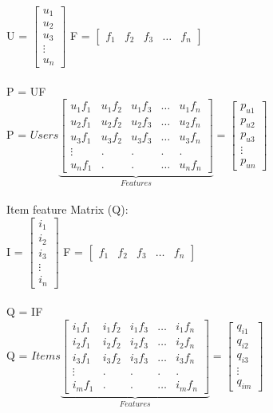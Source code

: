 \documentclass{article}
\begin{document}
\begin{center}
U = $\begin{bmatrix}
    u_1 \\ u_2 \\ u_3 \\ \vdots \\ u_n
\end{bmatrix}$
F = $\begin{bmatrix}
    f_1 & f _2 & f_3 & \hdots & f_n
\end{bmatrix}$ \\~\\
P = UF \\
P =
$Users\underbrace{\begin{bmatrix}
    u_1f_1 & u_1f_2 & u_1f_3 & \hdots &  u_1f_n\\ 
    u_2f_1 & u_2f_2 & u_2f_3 & \hdots &  u_2f_n\\
    u_3f_1 & u_3f_2 & u_3f_3 & \hdots &  u_3f_n\\ 
    \vdots & . & . & . & .\\
    u_nf_1 & . & . & \hdots & u_nf_n
\end{bmatrix}}_{Features} = \begin{bmatrix} p_{u1} \\ p_{u2} \\ p_{u3} \\ \vdots \\ p_{un} \end{bmatrix}$   \\~\\

Item feature Matrix (Q): \\

I = $\begin{bmatrix}
    i_1 \\ i_2 \\ i_3 \\ \vdots \\ i_n
\end{bmatrix}$
F = $\begin{bmatrix}
    f_1 & f _2 & f_3 & \hdots & f_n
\end{bmatrix}$ \\~\\
Q = IF \\
Q =
$Items\underbrace{\begin{bmatrix}
    i_1f_1 & i_1f_2 & i_1f_3 & \hdots &  i_1f_n\\ 
    i_2f_1 & i_2f_2 & i_2f_3 & \hdots &  i_2f_n\\
    i_3f_1 & i_3f_2 & i_3f_3 & \hdots &  i_3f_n\\ 
    \vdots & . & . & . & .\\
    i_mf_1 & . & . & \hdots & i_mf_n
\end{bmatrix}}_{Features} = \begin{bmatrix} q_{i1} \\ q_{i2} \\ q_{i3} \\ \vdots \\ q_{im} \end{bmatrix}$   \\~\\


\end{center}
\end{document}
